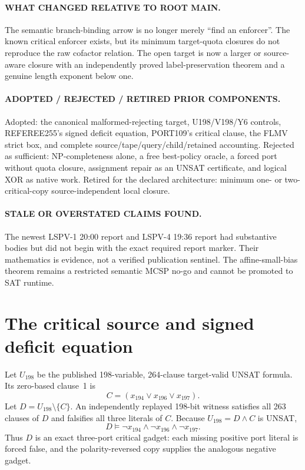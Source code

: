 \documentclass[11pt]{article}
\begin{document}
\paragraph{WHAT CHANGED RELATIVE TO ROOT MAIN.}
The semantic branch-binding arrow is no longer merely ``find an enforcer''.
The known critical enforcer exists, but its minimum target-quota closures do
not reproduce the raw cofactor relation.  The open target is now a larger or
source-aware closure with an independently proved label-preservation theorem
and a genuine length exponent below one.

\paragraph{ADOPTED / REJECTED / RETIRED PRIOR COMPONENTS.}
Adopted: the canonical malformed-rejecting target, U198/V198/Y6 controls,
REFEREE255's signed deficit equation, PORT109's critical clause, the FLMV
strict box, and complete source/tape/query/child/retained accounting.  Rejected
as sufficient: NP-completeness alone, a free best-policy oracle, a forced port
without quota closure, assignment repair as an UNSAT certificate, and logical
XOR as native work.  Retired for the declared architecture: minimum one- or
two-critical-copy source-independent local closure.

\paragraph{STALE OR OVERSTATED CLAIMS FOUND.}
The newest LSPV-1 20:00 report and LSPV-4 19:36 report had substantive bodies
but did not begin with the exact required report marker.  Their mathematics is
evidence, not a verified publication sentinel.  The affine-small-bias theorem
remains a restricted semantic MCSP no-go and cannot be promoted to SAT runtime.

\section{The critical source and signed deficit equation}

Let $U_{198}$ be the published 198-variable, 264-clause target-valid UNSAT
formula.  Its zero-based clause~1 is
\[
 C=(x_{194}\lor x_{196}\lor x_{197}).
\]
Let $D=U_{198}\setminus\{C\}$.  An independently replayed 198-bit witness
satisfies all 263 clauses of $D$ and falsifies all three literals of $C$.
Because $U_{198}=D\land C$ is UNSAT,
\[
 D\models \neg x_{194}\land\neg x_{196}\land\neg x_{197}.
\tag{1}
\]
Thus $D$ is an exact three-port critical gadget: each missing positive port
literal is forced false, and the polarity-reversed copy supplies the analogous
negative gadget.
\end{document}
